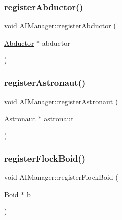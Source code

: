 \subsubsection{\texorpdfstring{register\+Abductor()}{registerAbductor()}}
{\footnotesize\ttfamily void A\+I\+Manager\+::register\+Abductor (\begin{DoxyParamCaption}\item[{\hyperlink{class_abductor}{Abductor} $\ast$}]{abductor }\end{DoxyParamCaption})\hspace{0.3cm}{\ttfamily [static]}}

\hypertarget{class_a_i_manager_af4c426ea6624b3fddebae90b38e60f8e}{}\label{class_a_i_manager_af4c426ea6624b3fddebae90b38e60f8e} 
\subsubsection{\texorpdfstring{register\+Astronaut()}{registerAstronaut()}}
{\footnotesize\ttfamily void A\+I\+Manager\+::register\+Astronaut (\begin{DoxyParamCaption}\item[{\hyperlink{class_astronaut}{Astronaut} $\ast$}]{astronaut }\end{DoxyParamCaption})\hspace{0.3cm}{\ttfamily [static]}}

\hypertarget{class_a_i_manager_a5104415d465d8b6f73999cf5623b20a5}{}\label{class_a_i_manager_a5104415d465d8b6f73999cf5623b20a5} 
\subsubsection{\texorpdfstring{register\+Flock\+Boid()}{registerFlockBoid()}}
{\footnotesize\ttfamily void A\+I\+Manager\+::register\+Flock\+Boid (\begin{DoxyParamCaption}\item[{\hyperlink{class_boid}{Boid} $\ast$}]{b }\end{DoxyParamCaption})\hspace{0.3cm}{\ttfamily [static]}}

\hypertarget{class_a_i_manager_aef2cec33330d60136ce1a3c1fa6ddf3d}{}\label{class_a_i_manager_aef2cec33330d60136ce1a3c1fa6ddf3d} 
